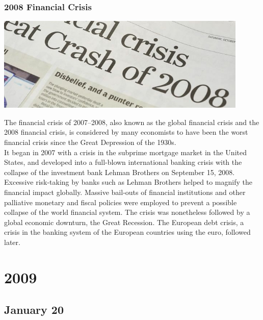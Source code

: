 \documentclass[11pt]{report}
\begin{document}
\subsection{2008 Financial Crisis}
\vspace{2mm}\begin{center}\includegraphics[width=12cm]{./img/fcrash2008.jpg}\end{center}
The financial crisis of 2007–2008, also known as the global financial crisis and the 2008 financial crisis, is considered by many economists to have been the worst financial crisis since the Great Depression of the 1930s.\\
\indent It began in 2007 with a crisis in the subprime mortgage market in the United States, and developed into a full-blown international banking crisis with the collapse of the investment bank Lehman Brothers on September 15, 2008. Excessive risk-taking by banks such as Lehman Brothers helped to magnify the financial impact globally. Massive bail-outs of financial institutions and other palliative monetary and fiscal policies were employed to prevent a possible collapse of the world financial system. The crisis was nonetheless followed by a global economic downturn, the Great Recession. The European debt crisis, a crisis in the banking system of the European countries using the euro, followed later.

\chapter{2009}
\section{January 20}
\end{document}

